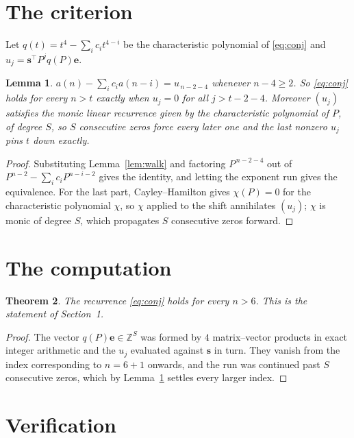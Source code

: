 \documentclass[11pt,a4paper]{article}
\theoremstyle{plain}
\newtheorem{theorem}{Theorem}
\newtheorem{lemma}[theorem]{Lemma}
\theoremstyle{definition}
\begin{document}
\section{The criterion}

Let $q(t)=t^{4}-\sum_i c_i t^{4-i}$ be the characteristic polynomial of
\eqref{eq:conj} and $u_j=\mathbf{s}^{\!\top}P^{j}q(P)\mathbf{e}$.

\begin{lemma}\label{lem:crit}
$a(n)-\sum_i c_i a(n-i)=u_{\,n-2-4}$ whenever $n-4\ge2$. So \eqref{eq:conj}
holds for every $n>t$ exactly when $u_j=0$ for all $j>t-2-4$. Moreover $(u_j)$
satisfies the monic linear recurrence given by the characteristic polynomial of $P$, of
degree $S$, so $S$ consecutive zeros force every later one and the last nonzero $u_j$ pins
$t$ down exactly.
\end{lemma}

\begin{proof}
Substituting Lemma~\ref{lem:walk} and factoring $P^{\,n-2-4}$ out of
$P^{n-2}-\sum_i c_i P^{n-i-2}$ gives the identity, and letting the exponent run gives the
equivalence. For the last part, Cayley--Hamilton gives $\chi(P)=0$ for the characteristic
polynomial $\chi$, so $\chi$ applied to the shift annihilates $(u_j)$; $\chi$ is monic of
degree $S$, which propagates $S$ consecutive zeros forward.
\end{proof}

\section{The computation}

\begin{theorem}
The recurrence \eqref{eq:conj} holds for every $n>6$. This is the statement of
Section~1.
\end{theorem}

\begin{proof}
The vector $q(P)\mathbf{e}\in\mathbb{Z}^{S}$ was formed by $4$ matrix--vector
products in exact integer arithmetic and the $u_j$ evaluated against $\mathbf{s}$ in turn.
They vanish from the index corresponding to $n=6+1$ onwards, and the run was continued
past $S$ consecutive zeros, which by Lemma~\ref{lem:crit} settles every larger index.
\end{proof}

\section{Verification}
\end{document}
